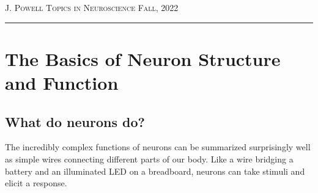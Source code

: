 \documentclass[12pt]{amsart}
\begin{document}
\bigskip
\bigskip
\bigskip
\bigskip
{}

\pagebreak




{\scshape J. Powell} \hfill {\scshape \large Topics in Neuroscience} \hfill {\scshape Fall, 2022}
 
\smallskip

\hrule
\bigskip
\normalsize 

\section{The Basics of Neuron Structure and Function}
\subsection{What do neurons do?} The incredibly complex functions of neurons can be summarized surprisingly well as simple wires connecting different parts of our body. Like a wire bridging a battery and an illuminated LED on a breadboard, neurons can take stimuli and elicit a response. 
\end{document}
